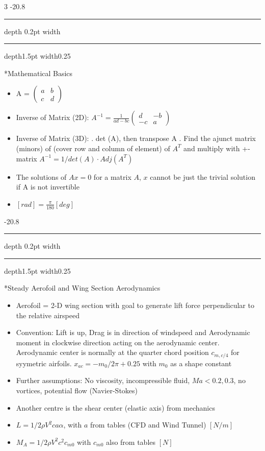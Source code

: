 \documentclass[8pt, landscape, fleqn]{scrartcl}
\makeatletter
\renewcommand{\section}{\@startsection{section}{1}{0mm}%
{-2\baselineskip}{0.8\baselineskip}%
{\hrule depth 0.2pt width\columnwidth\hrule depth1.5pt
width0.25\columnwidth\vspace*{1.2em}\Large\bfseries\rmfamily}}
\makeatother
\begin{document}
\begin{multicols*}{3}
\section*{Mathematical Basics}

\begin{itemize}
    \item A = $\begin{pmatrix} a & b \\ c & d
    \end{pmatrix}$
    \item Inverse of Matrix (2D): $A^{-1} = \frac{1}{ad-bc} \begin{pmatrix} d & -b \\ -c & a
    \end{pmatrix}$
    \item Inverse of Matrix (3D): 
        . det (A), then transpose A
        . Find the ajunct matrix (minors) of
        \subitem (cover row and column of element) of $A^T$ 
        \subitem and multiply with +- matrix
        \subitem $A^{-1} = 1/det(A)\cdot Adj(A^T)$
    \item The solutions of $A x = 0$ for a matrix $A$, $x$ cannot be just the trivial solution if A is not invertible
    \item $[rad] = \frac{\pi}{180} [deg]$
\end{itemize}



\section*{Steady Aerofoil and Wing Section Aerodynamics}

\begin{itemize}
    \item Aerofoil = 2-D wing section with goal to generate lift force perpendicular to the relative airspeed
    \item Convention: Lift is up, Drag is in direction of windspeed and Aerodynamic moment in clockwise direction acting on the aerodynamic center. Aerodynamic center is normally at the quarter chord position $c_{m,c/4}$ for syymetric airfoils. $x_{ac} = -m_0/2\pi +0.25$ with $m_0$ as a shape constant 
    \item Further assumptions: No viscosity, incompressible fluid, $Ma < 0.2,0.3$, no vortices, potential flow (Navier-Stokes)
    \item Another centre is the shear center (elastic axis) from mechanics
    \item $L = 1/2\rho V^2 c a \alpha$, with $a$ from tables (CFD and Wind Tunnel) $[N/m]$
    \item $M_A = 1/2\rho V^2c^2 c_{m0}$ with $c_{m0}$ also from tables $[N]$
\end{itemize}


\end{multicols*}
\end{document}
